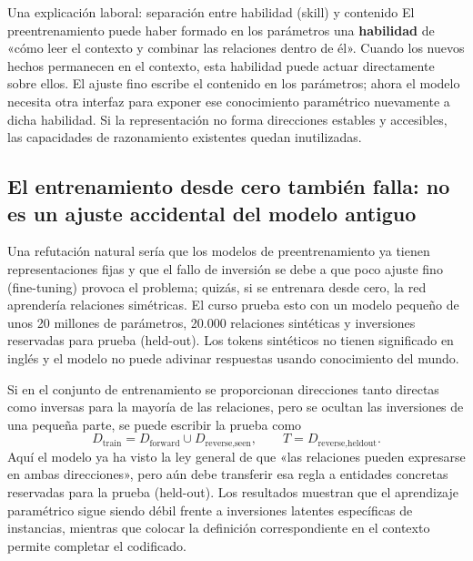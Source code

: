
\begin{knowledgebox}{Una explicación laboral: separación entre habilidad (skill) y contenido}
El preentrenamiento puede haber formado en los parámetros una \textbf{habilidad} de «cómo leer el contexto y combinar las relaciones dentro de él». Cuando los nuevos hechos permanecen en el contexto, esta habilidad puede actuar directamente sobre ellos. El ajuste fino escribe el contenido en los parámetros; ahora el modelo necesita otra interfaz para exponer ese conocimiento paramétrico nuevamente a dicha habilidad. Si la representación no forma direcciones estables y accesibles, las capacidades de razonamiento existentes quedan inutilizadas.
\end{knowledgebox}

\subsection{El entrenamiento desde cero también falla: no es un ajuste accidental del modelo antiguo}

Una refutación natural sería que los modelos de preentrenamiento ya tienen representaciones fijas y que el fallo de inversión se debe a que poco ajuste fino (fine-tuning) provoca el problema; quizás, si se entrenara desde cero, la red aprendería relaciones simétricas. El curso prueba esto con un modelo pequeño de unos 20 millones de parámetros, 20.000 relaciones sintéticas y inversiones reservadas para prueba (held-out). Los tokens sintéticos no tienen significado en inglés y el modelo no puede adivinar respuestas usando conocimiento del mundo.



Si en el conjunto de entrenamiento se proporcionan direcciones tanto directas como inversas para la mayoría de las relaciones, pero se ocultan las inversiones de una pequeña parte, se puede escribir la prueba como
$$
D_{\text{train}}=D_{\text{forward}}\cup D_{\text{reverse,seen}},
\qquad
T=D_{\text{reverse,heldout}}.
$$
Aquí el modelo ya ha visto la ley general de que «las relaciones pueden expresarse en ambas direcciones», pero aún debe transferir esa regla a entidades concretas reservadas para la prueba (held-out). Los resultados muestran que el aprendizaje paramétrico sigue siendo débil frente a inversiones latentes específicas de instancias, mientras que colocar la definición correspondiente en el contexto permite completar el codificado.


